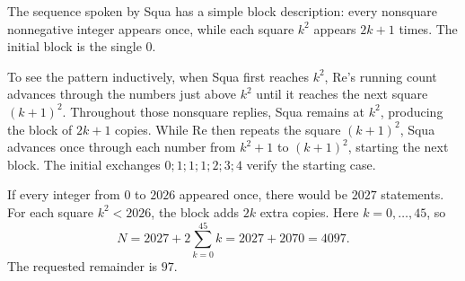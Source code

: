 The sequence spoken by Squa has a simple block description: every nonsquare nonnegative integer appears once, while each square $k^2$ appears $2k+1$ times. The initial block is the single $0$.

To see the pattern inductively, when Squa first reaches $k^2$, Re's running count advances through the numbers just above $k^2$ until it reaches the next square $(k+1)^2$. Throughout those nonsquare replies, Squa remains at $k^2$, producing the block of $2k+1$ copies. While Re then repeats the square $(k+1)^2$, Squa advances once through each number from $k^2+1$ to $(k+1)^2$, starting the next block. The initial exchanges $0;1;1;1;2;3;4$ verify the starting case.

If every integer from $0$ to $2026$ appeared once, there would be $2027$ statements. For each square $k^2<2026$, the block adds $2k$ extra copies. Here $k=0,\ldots,45$, so
\[
N=2027+2\sum_{k=0}^{45}k=2027+2070=4097.
\]
The requested remainder is $\boxed{97}$.
